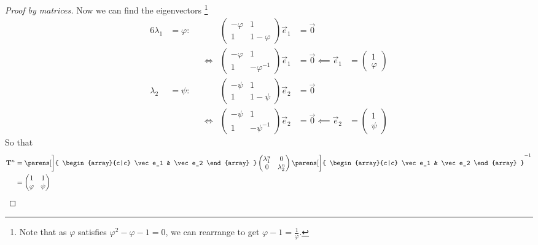 \begin{proof}[Proof by matrices]
 Now we can find the eigenvectors \footnote{
     Note that as \(\varphi\) satisfies \(\varphi^2 - \varphi - 1 = 0\),
     we can rearrange to get \(\varphi - 1 = \frac 1\varphi\).}
 \begin{alignat*}6
  \lambda_1 &= \varphi:&
  &&
   \begin{pmatrix}
    -\varphi & 1 \\
    1 & 1 - \varphi
   \end{pmatrix} \vec e_1 &= \vec 0 \\
  && &\iff{}&
   \begin{pmatrix}
    -\varphi & 1 \\
    1 & -\varphi^{-1}
   \end{pmatrix} \vec e_1 &= \vec 0 \impliedby \vec e_1 &{}=
   \begin{pmatrix}
    1 \\
    \varphi
   \end{pmatrix} \\
  \lambda_2 &= \psi:&
  &&
   \begin{pmatrix}
    -\psi & 1 \\
    1 & 1 - \psi
   \end{pmatrix} \vec e_2 &= \vec 0 \\
  && &\iff{}&
   \begin{pmatrix}
    -\psi & 1 \\
    1 & -\psi^{-1}
   \end{pmatrix} \vec e_2 &= \vec 0 \impliedby \vec e_2 &{}=
   \begin{pmatrix}
    1 \\
    \psi
   \end{pmatrix}
 \end{alignat*}
 So that
 \begin{align*}
  \mat T^n &=
  \parens[\bigg]{
   \begin{array}{c|c}
    \vec e_1 & \vec e_2
   \end{array}
  }
  \begin{pmatrix}
   \lambda_1^n & 0 \\
   0 & \lambda_2^n
  \end{pmatrix}
  \parens[\bigg]{
   \begin{array}{c|c}
    \vec e_1 & \vec e_2
   \end{array}
  }^{-1} \\
  &=
  \begin{pmatrix}
   1 & 1 \\
   \varphi & \psi
  \end{pmatrix}

\end{align*}
\end{proof}
